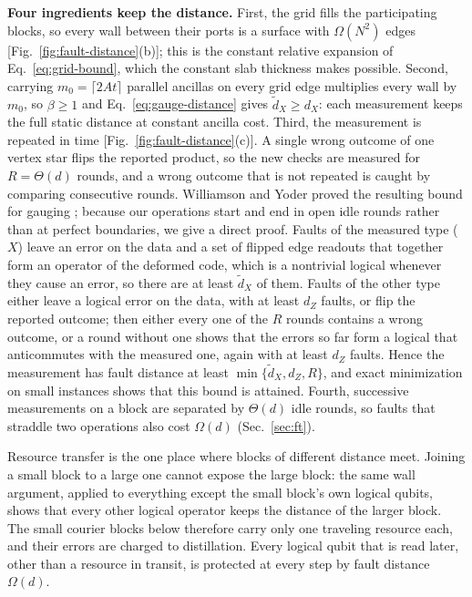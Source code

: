 \documentclass[10pt,a4paper,twocolumn]{article}
\begin{document}
\textbf{Four ingredients keep the distance.}  First, the grid fills the
participating blocks, so every wall between their ports is a surface with
$\Omega(N^2)$ edges [Fig.~\ref{fig:fault-distance}(b)]; this is the constant
relative expansion of Eq.~\eqref{eq:grid-bound}, which the constant slab
thickness makes possible.  Second, carrying $m_0=\lceil2At\rceil$ parallel
ancillas on every grid edge multiplies every wall by $m_0$, so $\beta\ge1$ and
Eq.~\eqref{eq:gauge-distance} gives $\widetilde d_X\ge d_X$: each measurement
keeps the full static distance at constant ancilla cost.  Third, the
measurement is repeated in time [Fig.~\ref{fig:fault-distance}(c)].  A single
wrong outcome of one vertex star flips the reported product, so the new checks
are measured for $R=\Theta(d)$ rounds, and a wrong outcome that is not repeated
is caught by comparing consecutive rounds.  Williamson and Yoder proved the
resulting bound for gauging \cite{WilliamsonYoderGauging}; because our
operations start and end in open idle rounds rather than at perfect boundaries,
we give a direct proof.  Faults of the measured type ($X$) leave an error on the
data and a set of flipped edge readouts that together form an operator of the
deformed code, which is a nontrivial logical whenever they cause an error, so
there are at least $\widetilde d_X$ of them.  Faults of the other type either
leave a logical error on the data, with at least $d_Z$ faults, or flip the
reported outcome; then either every one of the $R$ rounds contains a wrong
outcome, or a round without one shows that the errors so far form a logical
that anticommutes with the measured one, again with at least $d_Z$ faults.
Hence the measurement has fault distance at least
$\min\{\widetilde d_X,d_Z,R\}$, and exact minimization on small instances shows
that this bound is attained.  Fourth, successive measurements on a block are
separated by $\Theta(d)$ idle rounds, so faults that straddle two operations also
cost $\Omega(d)$ (Sec.~\ref{sec:ft}).

Resource transfer is the one place where blocks of different distance meet.
Joining a small block to a large one cannot expose the large block: the same
wall argument, applied to everything except the small block's own logical
qubits, shows that every other logical operator keeps the distance of the
larger block.  The small courier blocks below therefore carry only one
traveling resource each, and their errors are charged to distillation.  Every
logical qubit that is read later, other than a resource in transit, is
protected at every step by fault distance $\Omega(d)$.
\end{document}
